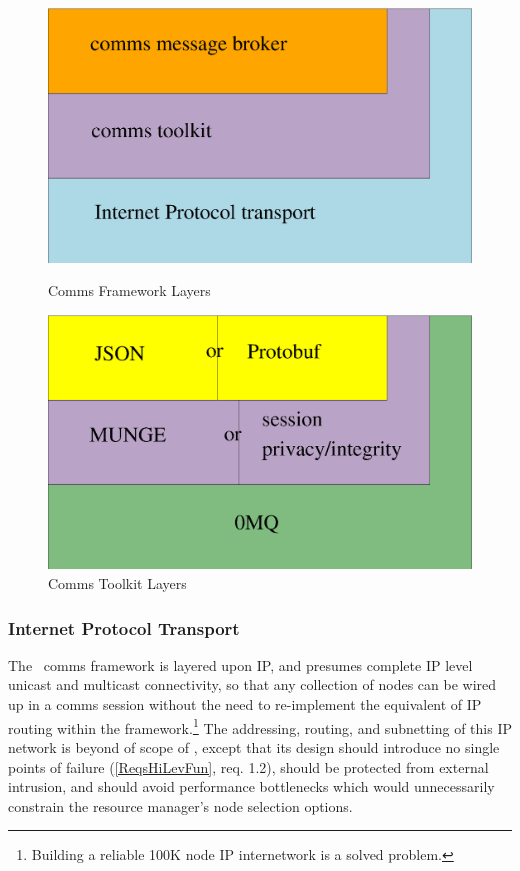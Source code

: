 \begin{figure}
\begin{minipage}[b]{0.45\linewidth}
\centering
\includegraphics[scale=0.30]{../fig/comms.eps}
\caption{Comms Framework Layers}
\label{FigCommsLayers}
\end{minipage}
\hspace{0.5cm}
\begin{minipage}[b]{0.45\linewidth}
\centering
\includegraphics[scale=0.30]{../fig/commstk.eps}
\caption{Comms Toolkit Layers}
\label{FigCommsTK}
\end{minipage}
\end{figure}

\subsubsection{Internet Protocol Transport}

The \ngrm\ comms framework is layered upon IP, and presumes
complete IP level unicast and multicast connectivity, so that any
collection of nodes can be wired up in a comms session without
the need to re-implement the equivalent of IP routing within
the framework.\footnote{Building a reliable 100K node IP internetwork
is a solved problem.} 
The addressing, routing, and subnetting of this IP network is beyond of
scope of \ngrm, except that its design should introduce no single
points of failure (\ref{ReqsHiLevFun}, req. 1.2), should be protected
from external intrusion, and should avoid performance bottlenecks which
would unnecessarily constrain the resource manager's node selection options.

